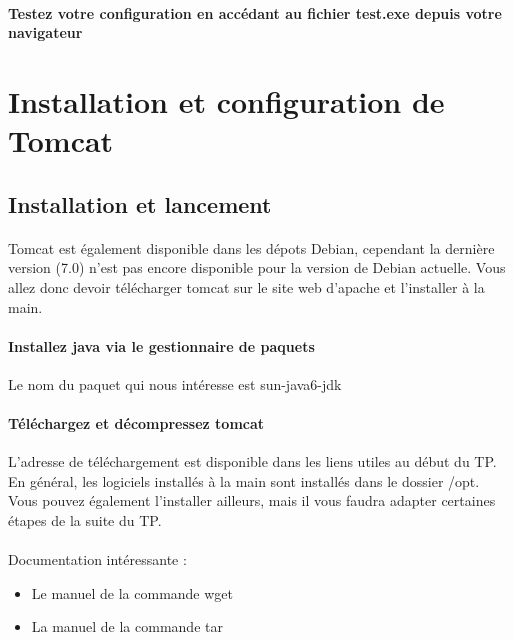 \documentclass[12pt,a4paper]{article}
\begin{document}
\paragraph{Testez votre configuration en accédant au fichier test.exe depuis votre navigateur}

\section{Installation et configuration de Tomcat}

\subsection{Installation et lancement}

\paragraph{}
Tomcat est également disponible dans les dépots Debian, cependant la dernière version (7.0) n'est pas encore disponible pour la version de Debian actuelle. Vous allez donc devoir télécharger tomcat sur le site web d'apache et l'installer à la main.

\paragraph{Installez java via le gestionnaire de paquets\\}
Le nom du paquet qui nous intéresse est sun-java6-jdk

\paragraph{Téléchargez et décompressez tomcat\\}
L'adresse de téléchargement est disponible dans les liens utiles au début du TP. En général, les logiciels installés à la main sont installés dans le dossier /opt. Vous pouvez également l'installer ailleurs, mais il vous faudra adapter certaines étapes de la suite du TP.

\paragraph{}
Documentation intéressante : 
\begin{itemize}
\item Le manuel de la commande wget
\item La manuel de la commande tar
\end{itemize}
\end{document}
